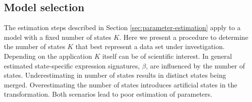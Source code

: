 \subsection{Model selection}
\label{sec:model-selection}

The estimation steps described in Section \ref{sec:parameter-estimation} apply to a model with a fixed number of states $K$. Here we present a procedure to determine the number of states $K$ that best represent a data set under investigation. Depending on the application $K$ itself can be of scientific interest. In general estimated state-specific expression signatures, $\beta$, are influenced by the number of states. Underestimating in number of states results in distinct states being merged. Overestimating the number of states introduces artificial states in the transformation. Both scenarios lead to poor estimation of parameters.


